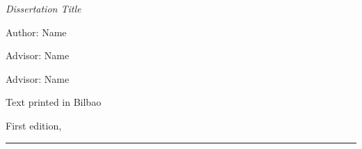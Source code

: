 
\thispagestyle{empty}

\hfill

\vfill

\medskip


\noindent
\textit{
Dissertation Title
}




Author: Name

Advisor: Name

Advisor: Name



\vfill

\vfill



\noindent
Text printed in Bilbao

\noindent
First edition, 
\monthname \ \the\year

\vspace{1cm}
\hrule
\bigskip

\cleardoublepage

%
%
%
%
%
%

